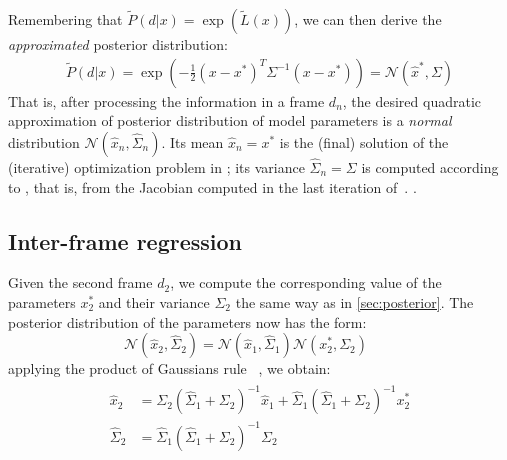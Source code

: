 % 
Remembering that $\tilde P(d|x) = \exp (\tilde{L}(x))$, we can then derive the \emph{approximated} posterior distribution:
%
\begin{align}
\tilde{P}(d|x) = \exp\left(- \tfrac{1}{2}(x - x^*)^T \Sigma^{-1}  (x - x^*) \right) = \mathcal{N}\left(\hat{x}^*, \Sigma \right)
\end{align}
%
That is, after processing the information in a frame $d_n$, the desired quadratic approximation of posterior distribution of model parameters is a \emph{normal} distribution $\mathcal{N}\left(\hat{x}_n, \hat{\Sigma}_n\right)$.
Its mean $\hat{x}_n = x^*$ is the (final) solution of the (iterative) optimization problem in ; its variance $\hat{\Sigma}_n = \Sigma$ is computed according to , that is, from the Jacobian computed in the last iteration of~. .

\newpage
\subsection{Inter-frame regression} 
\label{sec:combining}


Given the second frame $d_2$, we compute the corresponding value of the parameters $x_2^*$ and their variance $\Sigma_2$ the same way as in \ref{sec:posterior}. The posterior distribution of the parameters now has the form:
% 
\begin{equation}
\mathcal{N}(\hat{x}_2, \hat{\Sigma}_2) = \mathcal{N}(\hat{x}_1, \hat{\Sigma}_1) \mathcal{N}(x_2^*, \Sigma_2) \quad\quad
\end{equation}
% 
applying the product of Gaussians rule ~\cite{petersen2008matrix}, we obtain:
% 
\begin{align}
\begin{split}
\hat{x}_2 &= \Sigma_2 (\hat{\Sigma}_1 + \Sigma_2)^{-1} \hat{x}_1 + 
\hat{\Sigma}_1 (\hat{\Sigma}_1 + \Sigma_2)^{-1} x_2^*
\\
\hat{\Sigma}_2 &= \hat{\Sigma}_1 (\hat{\Sigma}_1 + \Sigma_2)^{-1} \Sigma_2
\label{eq:combining}
\end{split}
\end{align}

